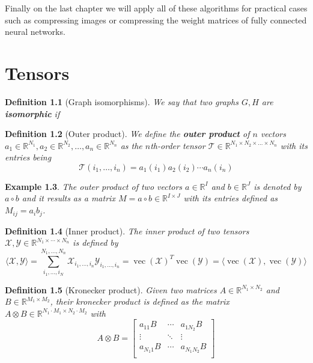 \documentclass[11pt,a4paper,openright,oneside]{book}
\numberwithin{equation}{section}
\newtheorem{defn0}{Definition}[chapter]
\newtheorem{example0}[defn0]{Example}
\newenvironment{definition}{ \begin{defn0}}{\end{defn0}}
\newenvironment{example}{ \begin{example0}\rm}{\end{example0}}
\DeclareMathOperator{\vectorize}{vec}
\begin{document}
Finally on the last chapter we will apply all of these algorithms for practical cases such as compressing images or
compressing the weight matrices of fully connected neural networks.

\chapter{Tensors}


\iffalse
\begin{definition}[Graph isomorphisms]
    We say that two graphs $G, H$ are \textbf{isomorphic} if 
\end{definition}


\begin{definition}[Outer product]
    We define the \textbf{outer product} of $n$ vectors 
    $a_1 \in \mathbb{R}^{N_1}, a_2 \in \mathbb{R}^{N_2}, \dots, a_n \in \mathbb{R}^{N_n}$
    as the $n$th-order tensor $\mathcal{T} \in \mathbb{R}^{N_1 \times N_2 \times \dots \times N_n}$ with its entries being
    $$\mathcal{T}(i_1, \dots, i_n) = a_1(i_1) a_2(i_2) \cdots a_n(i_n)$$
\end{definition}

\begin{example}
The outer product of two vectors $a \in \mathbb{R}^I$ and $b \in \mathbb{R}^J$ is denoted by $a \circ b$ and it results
as a matrix $M = a \circ b \in \mathbb{R}^{I \times J}$ with its entries defined as $M_{ij} = a_i b_j$.
\end{example}


\begin{definition}[Inner product]
The inner product of two tensors $\mathcal{X}, \mathcal{Y} \in \mathbb{R}^{N_1 \times \cdots \times N_n}$ is defined by
$$\langle \mathcal{X},\mathcal{Y} \rangle = \sum_{i_1, \dots, i_N}^{N_1, \dots, N_n} \mathcal{X}_{i_1, \dots, i_n} \mathcal{Y}_{i_1, \dots, i_n} = 
\vectorize(\mathcal{X})^T \vectorize(\mathcal{Y}) = \langle \vectorize(\mathcal{X}), \vectorize(\mathcal{Y}) \rangle$$
\end{definition}


\begin{definition}[Kronecker product]
     Given two matrices $A \in \mathbb{R}^{N_1 \times N_2}$ and $B \in \mathbb{R}^{M_1 \times M_2}$,
    their kronecker product is defined as the matrix $A \otimes B \in \mathbb{R}^{N_1 \cdot M_1 \times N_2 \cdot M_2}$ with
    $$A \otimes B = \begin{bmatrix}
        a_{11}B & \cdots & a_{1N_2}B \\ 
        \vdots & \ddots & \vdots \\
        a_{N_1 1}B & \cdots & a_{N_1 N_2}B \\
    \end{bmatrix}$$
\end{definition}
\end{document}
